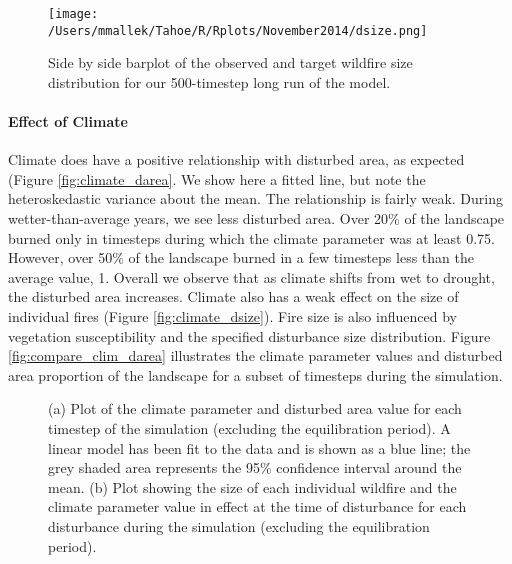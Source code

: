 \begin{figure}[!htbp]
\centering
\texttt{[image: /Users/mmallek/Tahoe/R/Rplots/November2014/dsize.png]}
\caption{Side by side barplot of the observed and target wildfire size distribution for our 500-timestep long run of the model.}
\label{fig:dsize}
\end{figure}



\paragraph{Effect of Climate} Climate does have a positive relationship with disturbed area, as expected (Figure \ref{fig:climate_darea}. We show here a fitted line, but note the heteroskedastic variance about the mean. The relationship is fairly weak. During wetter-than-average years, we see less disturbed area. Over 20\% of the landscape burned only in timesteps during which the climate parameter was at least 0.75. However, over 50\% of the landscape burned in a few timesteps less than the average value, 1. Overall we observe that as climate shifts from wet to drought, the disturbed area increases. Climate also has a weak effect on the size of individual fires (Figure \ref{fig:climate_dsize}). Fire size is also influenced by vegetation susceptibility and the specified disturbance size distribution. Figure \ref{fig:compare_clim_darea} illustrates the climate parameter values and disturbed area proportion of the landscape for a subset of timesteps during the simulation.

\begin{figure}[!htbp]
  \centering
  \caption{(a) Plot of the climate parameter and disturbed area value for each timestep of the simulation (excluding the  equilibration period). A linear model has been fit to the data and is shown as a blue line; the grey shaded area represents  the 95\% confidence interval around the mean. (b) Plot showing the size of each individual wildfire and the climate parameter value in effect at the time of disturbance for each disturbance during the simulation (excluding the equilibration period).}
  \label{fig:climate_disturbance}
\end{figure}

